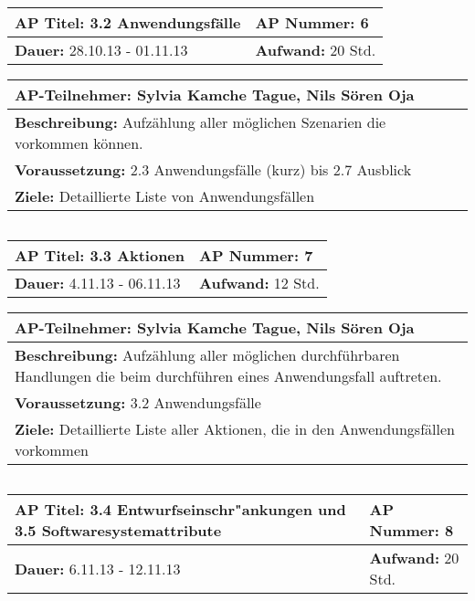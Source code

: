 \begin{verbatim}

\end{verbatim}
\begin{tabular}{|p{7.43cm}|p{7.43cm}|}
\hline
\textbf{AP Titel: }3.2 Anwendungsfälle & \textbf{AP Nummer: }6 \\ 
\hline
\textbf{Dauer: }28.10.13 - 01.11.13 & \textbf{Aufwand: }20 Std.\\
\hline
\end{tabular}
\begin{tabular}{|p{15.3cm}|}
\hline
\textbf{AP-Teilnehmer: }Sylvia Kamche Tague, Nils Sören Oja\\
\hline
\textbf{Beschreibung: }Aufzählung aller möglichen Szenarien die vorkommen können.\\
\hline
\textbf{Voraussetzung: }2.3 Anwendungsfälle (kurz) bis 2.7 Ausblick\\
\hline 
\textbf{Ziele: }Detaillierte Liste von Anwendungsfällen\\
\hline 
\end{tabular}
\begin{verbatim}

\end{verbatim}
\begin{tabular}{|p{7.43cm}|p{7.43cm}|}
\hline
\textbf{AP Titel: }3.3 Aktionen & \textbf{AP Nummer: }7\\ 
\hline
\textbf{Dauer: }4.11.13 - 06.11.13 & \textbf{Aufwand: }12 Std.\\
\hline
\end{tabular}
\begin{tabular}{|p{15.3cm}|}
\hline
\textbf{AP-Teilnehmer: }Sylvia Kamche Tague, Nils Sören Oja\\
\hline
\textbf{Beschreibung: }Aufzählung aller möglichen durchführbaren Handlungen die beim durchführen eines Anwendungsfall auftreten. \\
\hline
\textbf{Voraussetzung: }3.2 Anwendungsfälle\\
\hline 
\textbf{Ziele: }Detaillierte Liste aller Aktionen, die in den Anwendungsfällen vorkommen\\
\hline 
\end{tabular}
\begin{verbatim}

\end{verbatim}
\begin{tabular}{|p{7.43cm}|p{7.43cm}|}
\hline
\textbf{AP Titel: }3.4 Entwurfseinschr"ankungen und 3.5 Softwaresystemattribute & \textbf{AP Nummer: }8 \\ 
\hline
\textbf{Dauer: }6.11.13 - 12.11.13 & \textbf{Aufwand: }20 Std.\\
\hline
\end{tabular}
